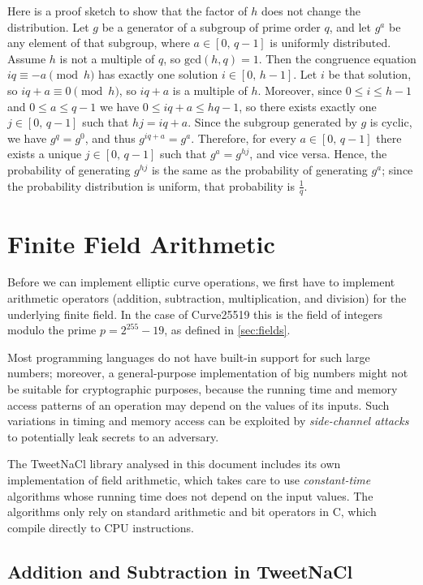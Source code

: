 \documentclass{article}
\begin{document}
Here is a proof sketch to show that the factor of $h$ does not change the distribution.
Let $g$ be a generator of a subgroup of prime order $q$, and let $g^a$ be any element of that subgroup, where $a \in [0,\, q-1]$ is uniformly distributed.
Assume $h$ is not a multiple of $q$, so $\mathrm{gcd}(h, q) = 1$.
Then the congruence equation $iq \equiv -a \pmod{h}$ has exactly one solution $i \in [0,\, h-1]$.
Let $i$ be that solution, so $iq + a \equiv 0 \pmod{h}$, so $iq + a$ is a multiple of $h$.
Moreover, since $0 \le i \le h-1$ and $0 \le a \le q-1$ we have $0 \le iq + a \le hq - 1$, so there exists exactly one $j \in [0,\, q-1]$ such that $hj = iq + a$.
Since the subgroup generated by $g$ is cyclic, we have $g^{q} = g^0$, and thus $g^{iq+a} = g^a$.
Therefore, for every $a \in [0,\, q-1]$ there exists a unique $j \in [0,\, q-1]$ such that $g^a = g^{hj}$, and vice versa.
Hence, the probability of generating $g^{hj}$ is the same as the probability of generating $g^a$; since the probability distribution is uniform, that probability is $\frac{1}{q}$.

\section{Finite Field Arithmetic}\label{sec:field-arithmetic}

Before we can implement elliptic curve operations, we first have to implement arithmetic operators (addition, subtraction, multiplication, and division) for the underlying finite field.
In the case of Curve25519 this is the field of integers modulo the prime $p = 2^{255} - 19$, as defined in \autoref{sec:fields}.

Most programming languages do not have built-in support for such large numbers; moreover, a general-purpose implementation of big numbers might not be suitable for cryptographic purposes, because the running time and memory access patterns of an operation may depend on the values of its inputs.
Such variations in timing and memory access can be exploited by \emph{side-channel attacks} to potentially leak secrets to an adversary.

The TweetNaCl library analysed in this document includes its own implementation of field arithmetic, which takes care to use \emph{constant-time} algorithms whose running time does not depend on the input values.
The algorithms only rely on standard arithmetic and bit operators in C, which compile directly to CPU instructions.

\subsection{Addition and Subtraction in TweetNaCl}\label{sec:add-subtract}
\end{document}
